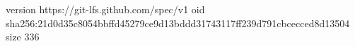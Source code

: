 version https://git-lfs.github.com/spec/v1
oid sha256:21d0d35c8054bbffd45279ce9d13bddd31743117ff239d791cbcecced8d13504
size 336
